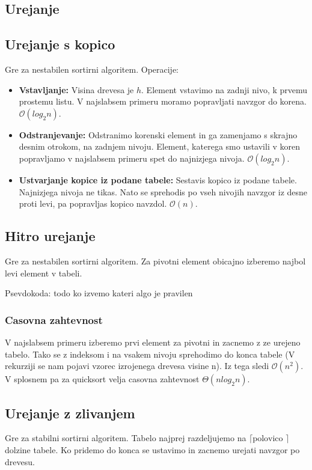 \documentclass{article}
\begin{document}
\begin{multicols}{4}
\section{Urejanje}
\subsection{Urejanje s kopico}
Gre za nestabilen sortirni algoritem.
Operacije:
\begin{itemize}
    \item \textbf{Vstavljanje:} Visina drevesa je $h$. Element vstavimo na zadnji nivo, k prvemu prostemu listu. V najslabsem primeru moramo popravljati navzgor do korena. $\mathcal{O}(log_2 n)$.
    \item \textbf{Odstranjevanje: } Odstranimo korenski element in ga zamenjamo s skrajno desnim otrokom, na zadnjem nivoju. Element, katerega smo ustavili v koren popravljamo v najslabsem primeru spet do najnizjega nivoja. $\mathcal{O}(log_2 n)$.
    \item \textbf{Ustvarjanje kopice iz podane tabele:} Sestavis kopico iz podane tabele. Najnizjega nivoja ne tikas. Nato se sprehodis po vseh nivojih navzgor iz desne proti levi, pa popravljas kopico navzdol. $\mathcal{O}(n)$.
\end{itemize}
\subsection{Hitro urejanje}
Gre za nestabilen sortirni algoritem. Za pivotni element obicajno izberemo najbol levi element v tabeli.

Psevdokoda:
todo ko izvemo kateri algo je pravilen

\subsubsection{Casovna zahtevnost}
V najslabsem primeru izberemo prvi element za pivotni in zacnemo z ze urejeno tabelo. Tako se z indeksom i na vsakem nivoju sprehodimo do konca tabele (V rekurziji se nam pojavi vzorec izrojenega drevesa visine n). Iz tega sledi $\mathcal{O}(n^2)$. V splosnem pa za quicksort velja casovna zahtevnost $\Theta (nlog_2 n)$.

\subsection{Urejanje z zlivanjem}
Gre za stabilni sortirni algoritem.
Tabelo najprej razdeljujemo na $\lceil \text{polovico }\rceil$ dolzine tabele.
Ko pridemo do konca se ustavimo in zacnemo urejati navzgor po drevesu.


\end{multicols}
\end{document}
